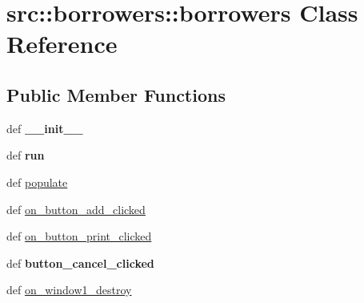 \hypertarget{classsrc_1_1borrowers_1_1borrowers}{
\section{src::borrowers::borrowers Class Reference}
\label{classsrc_1_1borrowers_1_1borrowers}
}
\subsection*{Public Member Functions}
\begin{DoxyCompactItemize}
\item 
\hypertarget{classsrc_1_1borrowers_1_1borrowers_ab519f00ccd7650ba004de20a02e35362}{
def {\bfseries \_\-\_\-init\_\-\_\-}}
\label{classsrc_1_1borrowers_1_1borrowers_ab519f00ccd7650ba004de20a02e35362}

\item 
\hypertarget{classsrc_1_1borrowers_1_1borrowers_a84e5449f2500a6cdd9c65750b5816f63}{
def {\bfseries run}}
\label{classsrc_1_1borrowers_1_1borrowers_a84e5449f2500a6cdd9c65750b5816f63}

\item 
def \hyperlink{classsrc_1_1borrowers_1_1borrowers_a0b819d4a787a9e962340ac2b308feb7b}{populate}
\item 
def \hyperlink{classsrc_1_1borrowers_1_1borrowers_a3dc8d64d9dad50706281469e2181e286}{on\_\-button\_\-add\_\-clicked}
\item 
def \hyperlink{classsrc_1_1borrowers_1_1borrowers_add688c932f9093a3611a8552b14acfd3}{on\_\-button\_\-print\_\-clicked}
\item 
\hypertarget{classsrc_1_1borrowers_1_1borrowers_a2e06cbe3d2d3992c9a7e013eca3b1bb7}{
def {\bfseries button\_\-cancel\_\-clicked}}
\label{classsrc_1_1borrowers_1_1borrowers_a2e06cbe3d2d3992c9a7e013eca3b1bb7}

\item 
def \hyperlink{classsrc_1_1borrowers_1_1borrowers_a9c98c596cf62fb58edd1f3e19a77abda}{on\_\-window1\_\-destroy}
\end{DoxyCompactItemize}
